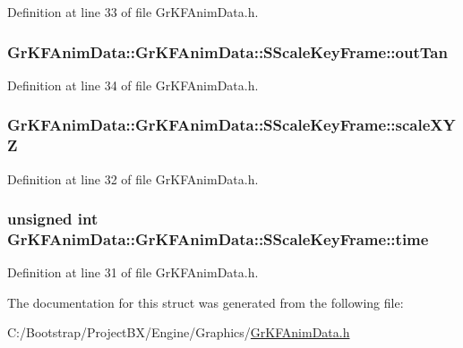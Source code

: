 Definition at line 33 of file GrKFAnimData.h.\hypertarget{struct_gr_k_f_anim_data_1_1_s_scale_key_frame_772af69bbc1d28d93b6dde176e274919}{
\subsubsection[{outTan}]{ GrKFAnimData::GrKFAnimData::SScaleKeyFrame::outTan}}
\label{struct_gr_k_f_anim_data_1_1_s_scale_key_frame_772af69bbc1d28d93b6dde176e274919}




Definition at line 34 of file GrKFAnimData.h.\hypertarget{struct_gr_k_f_anim_data_1_1_s_scale_key_frame_c00812c1d3e2194a2bee92f449109738}{
\subsubsection[{scaleXYZ}]{ GrKFAnimData::GrKFAnimData::SScaleKeyFrame::scaleXYZ}}
\label{struct_gr_k_f_anim_data_1_1_s_scale_key_frame_c00812c1d3e2194a2bee92f449109738}




Definition at line 32 of file GrKFAnimData.h.\hypertarget{struct_gr_k_f_anim_data_1_1_s_scale_key_frame_140965e423cda2172248141f124ef7f7}{
\subsubsection[{time}]{\setlength{\rightskip}{0pt plus 5cm}unsigned int GrKFAnimData::GrKFAnimData::SScaleKeyFrame::time}}
\label{struct_gr_k_f_anim_data_1_1_s_scale_key_frame_140965e423cda2172248141f124ef7f7}




Definition at line 31 of file GrKFAnimData.h.

The documentation for this struct was generated from the following file:\begin{CompactItemize}
\item 
C:/Bootstrap/ProjectBX/Engine/Graphics/\hyperlink{_gr_k_f_anim_data_8h}{GrKFAnimData.h}\end{CompactItemize}
